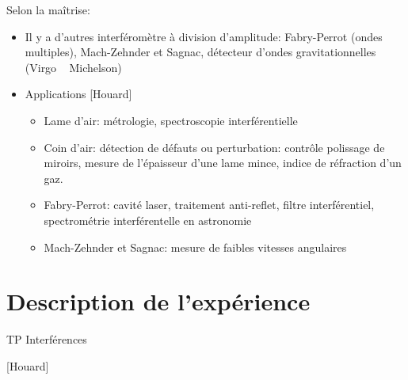 \documentclass[11pt]{report}
\numberwithin{figure}{section}
\numberwithin{equation}{section}
\numberwithin{table}{section}
\newcommand{\1}{\boldsymbol{1}}
\begin{document}
Selon la maîtrise: 
\begin{itemize}
\item Il y a d'autres interféromètre à division d'amplitude: Fabry-Perrot (ondes multiples), Mach-Zehnder et Sagnac, détecteur d'ondes gravitationnelles (Virgo ~ Michelson)
\item Applications [Houard]
	\begin{itemize}
	\item Lame d'air: métrologie, spectroscopie interférentielle
	\item Coin d'air: détection de défauts ou perturbation: contrôle polissage de miroirs, mesure de l'épaisseur d'une lame mince, indice de réfraction d'un gaz.
	\item Fabry-Perrot: cavité laser, traitement anti-reflet, filtre interférentiel, spectrométrie interférentelle en astronomie
	\item Mach-Zehnder et Sagnac: mesure de faibles vitesses angulaires
	\end{itemize}
\end{itemize}



\section*{Description de l'expérience}


\textcolor{mycolor5}{TP Interférences}

[Houard]
\end{document}
